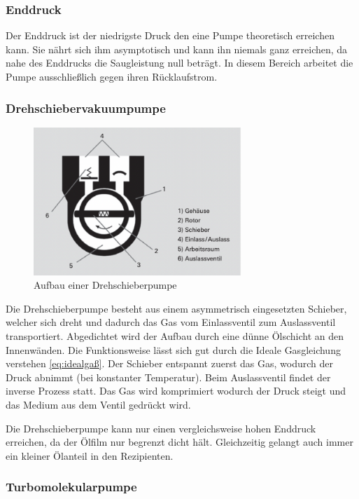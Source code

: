 \subsubsection*{Enddruck}
Der Enddruck ist der niedrigste Druck den eine Pumpe theoretisch erreichen kann.
Sie nährt sich ihm asymptotisch und kann ihn niemals ganz erreichen,
da nahe des Enddrucks die Saugleistung null beträgt.
In diesem Bereich arbeitet die Pumpe ausschließlich gegen ihren Rücklaufstrom.

\subsubsection{Drehschiebervakuumpumpe}
\begin{figure}[h]
    \centering
    \includegraphics[width=0.7\textwidth]{abb/drehpumpe.png}
    \caption{Aufbau einer Drehschieberpumpe \cite{Pfeifer}} 
    \label{fig:drehpumpe}
\end{figure} 
Die Drehschieberpumpe besteht aus einem asymmetrisch eingesetzten Schieber, 
welcher sich dreht und dadurch das Gas vom Einlassventil zum Auslassventil transportiert.
Abgedichtet wird der Aufbau durch eine dünne Ölschicht an den Innenwänden.
Die Funktionsweise lässt sich gut durch die Ideale Gasgleichung verstehen \eqref{eq:idealgaß}.
Der Schieber entspannt zuerst das Gas, 
wodurch der Druck abnimmt (bei konstanter Temperatur).
Beim Auslassventil findet der inverse Prozess statt.
Das Gas wird komprimiert wodurch der Druck steigt 
und das Medium aus dem Ventil gedrückt wird.

Die Drehschieberpumpe kann nur einen vergleichsweise hohen Enddruck erreichen,
da der Ölfilm nur begrenzt dicht hält.
Gleichzeitig gelangt auch immer ein kleiner Ölanteil in den Rezipienten.

\subsubsection{Turbomolekularpumpe}